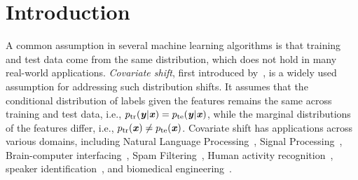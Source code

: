 \section{Introduction}

A common assumption in several machine learning algorithms is that training and test data come from the same distribution, which does not hold in many real-world applications. {\em Covariate shift}, first introduced by~\textcite{shimodaira2000improving}, is a widely used assumption for addressing such distribution shifts. It assumes that the conditional distribution of labels given the features remains the same across training and test data, i.e., $p_{\mathrm{tr}}(\boldsymbol{\mathit{y}}|\boldsymbol{\mathit{x}}) = p_{\mathrm{te}}(\boldsymbol{\mathit{y}}|\boldsymbol{\mathit{x}})$, while the marginal distributions of the features differ, i.e., $p_{\mathrm{tr}}(\boldsymbol{\mathit{x}}) \neq p_{\mathrm{te}}(\boldsymbol{\mathit{x}})$. Covariate shift has applications across various domains, including Natural Language Processing~\cite{yamada2010semi}, Signal Processing~\cite{yamada2012no}, Brain-computer interfacing~\cite{li2010application}, Spam Filtering~\cite{bickel2006dirichlet}, Human activity recognition~\cite{hachiya2012importance}, speaker identification~\cite{yamada2010semi}, and biomedical engineering~\cite{li2010application}.


